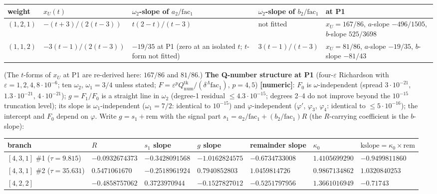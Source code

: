 \documentclass[10pt]{article}
\begin{document}
\begin{center}\footnotesize\setlength{\tabcolsep}{3pt}\begin{longtable}{@{}p{1.5cm}p{2.8cm}p{2.9cm}p{2.9cm}p{4.6cm}@{}}\toprule
\textbf{weight} & \textbf{$x_U(t)$} & \textbf{$\omega_2$-slope of $a_2/\mathrm{fac}_1$} & \textbf{$\omega_2$-slope of $b_2/\mathrm{fac}_1$} & \textbf{at P1} \\\midrule\endhead
$(1,2,1)$ & $-(t+3)/(2(t-3))$ & $t(2-t)/(t-3)$ & not fitted & $x_U=167/86$, $a$-slope $-496/1505$, $b$-slope $525/3698$ \\
$(1,1,2)$ & $-3(t-1)/(2(t-3))$ & $-19/35$ at P1 (zero at an isolated $t$; $t$-form not fitted) & $3(t-1)/(t-3)$ & $x_U=81/86$, $a$-slope $-19/35$, $b$-slope $-81/43$ \\
\bottomrule\end{longtable}\end{center}

(The $t$-forms of $x_U$ at P1 are re-derived here: $167/86$ and $81/86$.) \textbf{The Q-number structure at P1} (four-$\varepsilon$ Richardson with $\varepsilon=1,2,4,8\cdot10^{-6}$; ten $\omega_2$, $\omega_1=3/4$ unless stated; $F=\varepsilon^p Q^{\mathrm{tk}}_{\mathrm{num}}/(\delta^\Lambda\mathrm{fac}_1)$, $p=4,5$) \textbf{[numeric]}: $F_0$ is $\omega$-independent (spread $3\cdot10^{-21}$, $1.3\cdot10^{-21}$, $4\cdot10^{-21}$); $g=F_1/F_0$ is a straight line in $\omega_2$ (degree-1 residual $\le4.3\cdot10^{-15}$; degrees 2--4 do not improve beyond the $10^{-15}$ truncation level); its slope is $\omega_1$-independent ($\omega_1=7/2$: identical to $10^{-15}$) and $\varphi$-independent ($\varphi'$, $\varphi_3$, $\varphi_4$: identical to $\le5\cdot10^{-16}$); the intercept and $F_0$ depend on $\varphi$. Write $g=s_1+\mathrm{rem}$ with the signal part $s_1=a_2/\mathrm{fac}_1+(b_2/\mathrm{fac}_1)R$ (the $R$-carrying coefficient is the $b$-slope):

\begin{center}\footnotesize\setlength{\tabcolsep}{3pt}\begin{longtable}{@{}p{2.5cm}p{1.9cm}p{1.9cm}p{1.9cm}p{1.9cm}p{1.9cm}p{2.0cm}@{}}\toprule
\textbf{branch} & \textbf{$R$} & \textbf{$s_1$ slope} & \textbf{$g$ slope} & \textbf{remainder slope} & \textbf{$\kappa_0$} & \textbf{$\mathrm{kslope}=\kappa_0\times\mathrm{rem}$} \\\midrule\endhead
$[4,3,1]$ \#1 ($\tau=9.815$) & $-0.0932674373$ & $-0.3428091568$ & $-1.0162824575$ & $-0.6734733008$ & $1.4105699290$ & $-0.9499811860$ \\
$[4,3,1]$ \#2 ($\tau=35.631$) & $0.5471061670$ & $-0.2518961924$ & $0.7940852803$ & $1.0459814726$ & $0.9867134862$ & $1.0320840253$ \\
$[4,2,2]$ & $-0.4858757062$ & $0.3723970944$ & $-0.1527827012$ & $-0.5251797956$ & $1.3661016949$ & $-0.71743$ \\
\bottomrule\end{longtable}\end{center}
\end{document}
